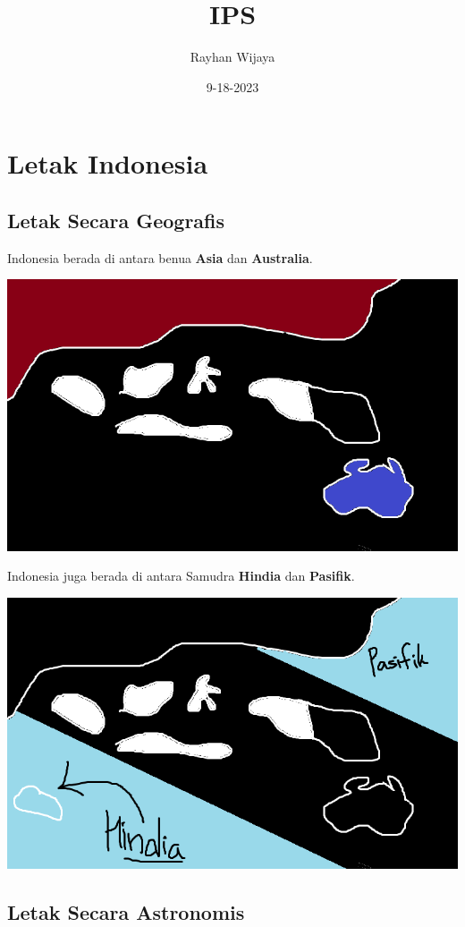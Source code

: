 \documentclass[12pt]{report}
\title{IPS}
\author{Rayhan Wijaya}
\date{9-18-2023}
\begin{document}
\maketitle

\section*{Letak Indonesia}

\subsection*{Letak Secara Geografis}

Indonesia berada di antara benua \textbf{Asia} dan \textbf{Australia}.

\includegraphics[scale=0.63]{indonesia-asia-australia}

Indonesia juga berada di antara Samudra \textbf{Hindia} dan \textbf{Pasifik}.

\includegraphics[scale=0.63]{indonesia-hindia-pasifik}

\subsection*{Letak Secara Astronomis}
\end{document}
